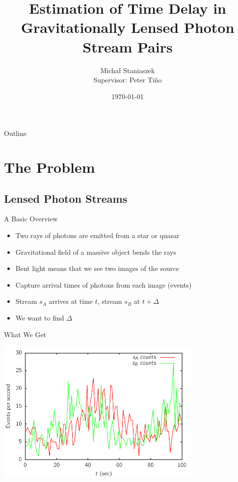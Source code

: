 \documentclass{beamer}
\title[Photon Time Delay Estimation] %
{Estimation of Time Delay in Gravitationally Lensed Photon Stream Pairs}
\author[Micha{\l} Staniaszek]{\large{Micha{\l} Staniaszek} \\ \scriptsize{Supervisor: Peter Ti\v{n}o}}
\institute[bham]{The University of Birmingham}
\date{\today}
\begin{document}
\begin{frame}
  \titlepage
\end{frame}

\begin{frame}{Outline}
  \tableofcontents
\end{frame}

\section{The Problem}

\subsection{Lensed Photon Streams}

\begin{frame}{A Basic Overview}
  \begin{itemize}
  \item<2-> Two rays of photons are emitted from a star or quasar
  \item<3-> Gravitational field of a massive object bends the rays
  \item<4-> Bent light means that we see two images of the source
  \item<5-> Capture arrival times of photons from each image (events)
  \item<6-> Stream $s_A$ arrives at time $t$, stream $s_B$ at $t + \Delta$
  \item<7-> \alert{We want to find $\Delta$}
  \end{itemize}
\end{frame}

\begin{frame}{What We Get}
  \begin{center}
      \includegraphics[width=4in]{twostreams_count}
  \end{center}
\end{frame}
\end{document}
